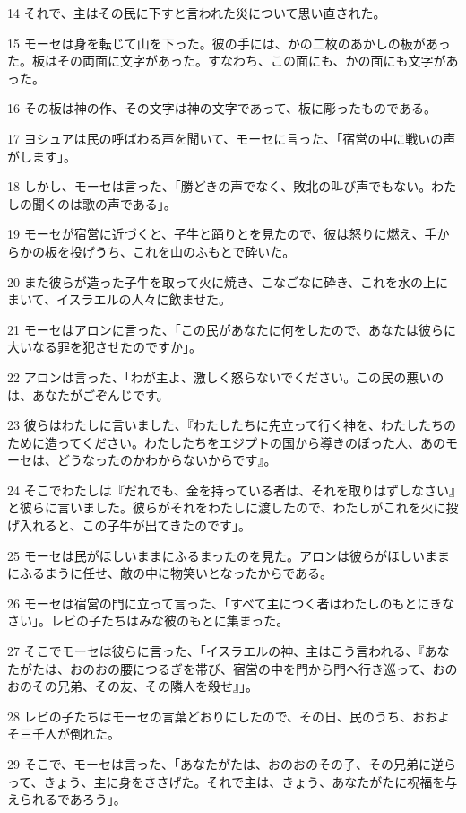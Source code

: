 \par 14 それで、主はその民に下すと言われた災について思い直された。
\par 15 モーセは身を転じて山を下った。彼の手には、かの二枚のあかしの板があった。板はその両面に文字があった。すなわち、この面にも、かの面にも文字があった。
\par 16 その板は神の作、その文字は神の文字であって、板に彫ったものである。
\par 17 ヨシュアは民の呼ばわる声を聞いて、モーセに言った、「宿営の中に戦いの声がします」。
\par 18 しかし、モーセは言った、「勝どきの声でなく、敗北の叫び声でもない。わたしの聞くのは歌の声である」。
\par 19 モーセが宿営に近づくと、子牛と踊りとを見たので、彼は怒りに燃え、手からかの板を投げうち、これを山のふもとで砕いた。
\par 20 また彼らが造った子牛を取って火に焼き、こなごなに砕き、これを水の上にまいて、イスラエルの人々に飲ませた。
\par 21 モーセはアロンに言った、「この民があなたに何をしたので、あなたは彼らに大いなる罪を犯させたのですか」。
\par 22 アロンは言った、「わが主よ、激しく怒らないでください。この民の悪いのは、あなたがごぞんじです。
\par 23 彼らはわたしに言いました、『わたしたちに先立って行く神を、わたしたちのために造ってください。わたしたちをエジプトの国から導きのぼった人、あのモーセは、どうなったのかわからないからです』。
\par 24 そこでわたしは『だれでも、金を持っている者は、それを取りはずしなさい』と彼らに言いました。彼らがそれをわたしに渡したので、わたしがこれを火に投げ入れると、この子牛が出てきたのです」。
\par 25 モーセは民がほしいままにふるまったのを見た。アロンは彼らがほしいままにふるまうに任せ、敵の中に物笑いとなったからである。
\par 26 モーセは宿営の門に立って言った、「すべて主につく者はわたしのもとにきなさい」。レビの子たちはみな彼のもとに集まった。
\par 27 そこでモーセは彼らに言った、「イスラエルの神、主はこう言われる、『あなたがたは、おのおの腰につるぎを帯び、宿営の中を門から門へ行き巡って、おのおのその兄弟、その友、その隣人を殺せ』」。
\par 28 レビの子たちはモーセの言葉どおりにしたので、その日、民のうち、おおよそ三千人が倒れた。
\par 29 そこで、モーセは言った、「あなたがたは、おのおのその子、その兄弟に逆らって、きょう、主に身をささげた。それで主は、きょう、あなたがたに祝福を与えられるであろう」。
